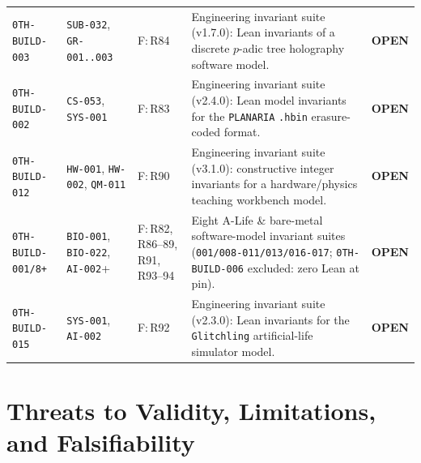\documentclass[11pt,reqno]{amsart}
\theoremstyle{plain}
\theoremstyle{definition}
\newcommand{\tcode}[1]{{\scriptsize\nolinkurl{#1}}}
\begin{document}
\begin{table}[t]
\begin{tabularx}{\textwidth}{@{}P{2.35cm}P{1.80cm}P{1.75cm}YP{1.05cm}@{}}
\tcode{0TH-BUILD-003} & \tcode{SUB-032}, \tcode{GR-001..003} & F:\,R84 & Engineering invariant suite (v1.7.0): Lean invariants of a discrete $p$-adic tree holography software model. & \textbf{OPEN} \\
\tcode{0TH-BUILD-002} & \tcode{CS-053}, \tcode{SYS-001} & F:\,R83 & Engineering invariant suite (v2.4.0): Lean model invariants for the \tcode{PLANARIA} \tcode{.hbin} erasure-coded format. & \textbf{OPEN} \\
\tcode{0TH-BUILD-012} & \tcode{HW-001}, \tcode{HW-002}, \tcode{QM-011} & F:\,R90 & Engineering invariant suite (v3.1.0): constructive integer invariants for a hardware/physics teaching workbench model. & \textbf{OPEN} \\
\tcode{0TH-BUILD-001/8+} & \tcode{BIO-001}, \tcode{BIO-022}, \tcode{AI-002}+ & F:\,R82, R86--89, R91, R93--94 & Eight A-Life \& bare-metal software-model invariant suites (\tcode{001/008-011/013/016-017}; \tcode{0TH-BUILD-006} excluded: zero Lean at pin). & \textbf{OPEN} \\
\tcode{0TH-BUILD-015} & \tcode{SYS-001}, \tcode{AI-002} & F:\,R92 & Engineering invariant suite (v2.3.0): Lean invariants for the \tcode{Glitchling} artificial-life simulator model. & \textbf{OPEN} \\
\bottomrule
\end{tabularx}
\end{table}

\section{Threats to Validity, Limitations, and Falsifiability}
\label{sec:limitations}
\end{document}
